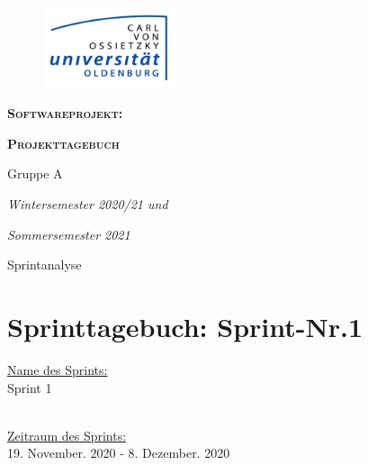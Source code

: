\documentclass[12pt,a4paper, oneside]{article}
\author{Uni Oldenburg, SWP2020 Gruppe A}
\begin{document}
    \begin{titlepage}
        \pagestyle{empty}
        \begin{center}

            \begin{figure}[h]
                \centering
                \includegraphics[width=0.35\textwidth]{img/Logo.jpg}
            \end{figure}

            \bigskip \bigskip \noindent
            \textsc{\textbf{\LARGE Softwareprojekt:}} \par \bigskip \noindent
            \textsc{\textbf{\LARGE Projekttagebuch}}


            \par \bigskip \bigskip \bigskip \bigskip \bigskip \noindent
            {\Large Gruppe A} \par \medskip \noindent

            \par \bigskip \bigskip \bigskip \bigskip \bigskip \bigskip \noindent
            \textit{\Large Wintersemester 2020/21 und} \par \noindent
            \textit{\Large Sommersemester 2021}

            \par \bigskip \bigskip \bigskip \bigskip \bigskip \bigskip \noindent
            \par \bigskip \bigskip \bigskip \noindent
            {\Large Sprintanalyse} \par \medskip \noindent

        \end{center}
    \end{titlepage}

    \tableofcontents
    \pagebreak


    \section{Sprinttagebuch: Sprint-Nr.1}
    \underline{Name des Sprints:}
    \\
    Sprint 1

    \noindent
    \\
    \underline{Zeitraum des Sprints:}
    \\
    19. November. 2020 - 8. Dezember. 2020
\end{document}
